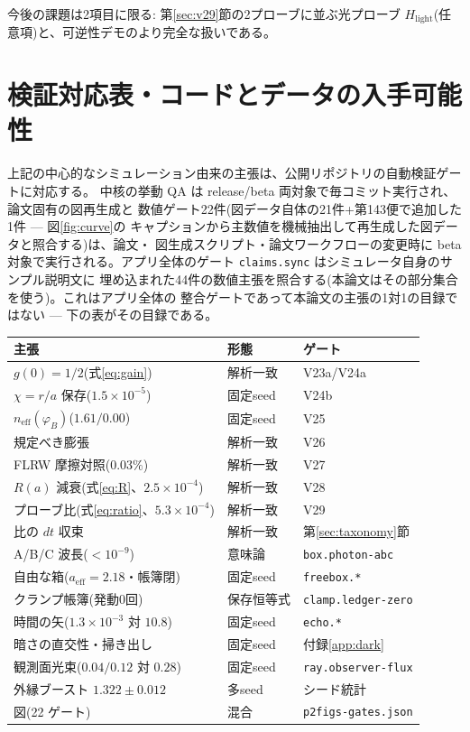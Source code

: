 \documentclass[a4paper,10pt,twocolumn]{ltjsarticle}
\begin{document}
今後の課題は2項目に限る: 第\ref{sec:v29}節の2プローブに並ぶ光プローブ
$H_{\mathrm{light}}$(任意項)と、可逆性デモのより完全な扱いである。

\section{検証対応表・コードとデータの入手可能性}
\label{sec:repro}

上記の中心的なシミュレーション由来の主張は、公開リポジトリの自動検証ゲートに対応する。
中核の挙動 QA は release/beta 両対象で毎コミット実行され、論文固有の図再生成と
数値ゲート22件(図データ自体の21件+第143便で追加した1件 — 図\ref{fig:curve}の
キャプションから主数値を機械抽出して再生成した図データと照合する)は、論文・
図生成スクリプト・論文ワークフローの変更時に beta 対象で実行される。アプリ全体のゲート \texttt{claims.sync} はシミュレータ自身のサンプル説明文に
埋め込まれた44件の数値主張を照合する(本論文はその部分集合を使う)。これはアプリ全体の
整合ゲートであって本論文の主張の1対1の目録ではない --- 下の表がその目録である。

\begin{center}
{\small\setlength{\tabcolsep}{3pt}
\begin{tabularx}{\columnwidth}{@{}YlY@{}}
主張 & 形態 & ゲート \\
\hline
$g(0)=1/2$(式\ref{eq:gain}) & 解析一致 & V23a/V24a \\
$\chi=r/a$ 保存($1.5{\times}10^{-5}$) & 固定seed & V24b \\
$n_{\mathrm{eff}}(\varphi_B)$($1.61/0.00$) & 固定seed & V25 \\
規定べき膨張 & 解析一致 & V26 \\
FLRW 摩擦対照($0.03\%$) & 解析一致 & V27 \\
$R(a)$ 減衰(式\ref{eq:R}、$2.5{\times}10^{-4}$) & 解析一致 & V28 \\
プローブ比(式\ref{eq:ratio}、$5.3{\times}10^{-4}$) & 解析一致 & V29 \\
比の $dt$ 収束 & 解析一致 & 第\ref{sec:taxonomy}節 \\
A/B/C 波長($<10^{-9}$) & 意味論 & \texttt{box.photon-abc} \\
自由な箱($a_{\mathrm{eff}}{=}2.18$・帳簿閉) & 固定seed & \texttt{freebox.*} \\
クランプ帳簿(発動0回) & 保存恒等式 & \texttt{clamp.ledger-zero} \\
時間の矢($1.3{\times}10^{-3}$ 対 $10.8$) & 固定seed & \texttt{echo.*} \\
暗さの直交性・掃き出し & 固定seed & 付録\ref{app:dark} \\
観測面光束($0.04/0.12$ 対 $0.28$) & 固定seed & \texttt{ray.observer-flux} \\
外縁ブースト $1.322\pm0.012$ & 多seed & シード統計 \\
図(22 ゲート) & 混合 & \texttt{p2figs-\allowbreak gates.json} \\
\end{tabularx}}
\end{center}
\end{document}
